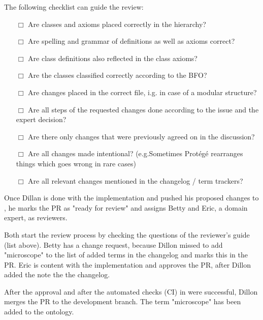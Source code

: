 The following checklist can guide the review:
\begin{itemize}
    \item[$\Box$] Are classes and axioms placed correctly in the hierarchy?
    \item[$\Box$] Are spelling and grammar of definitions as well as axioms correct?
    \item[$\Box$] Are class definitions also reflected in the class axioms?
    \item[$\Box$] Are the classes classified correctly according to the BFO?
    \item[$\Box$] Are changes placed in the correct file, i.g. in case of a modular structure?
    \item[$\Box$] Are all steps of the requested changes done according to the issue and the expert decision?
    \item[$\Box$] Are there only changes that were previously agreed on in the discussion?
    \item[$\Box$] Are all changes made intentional? (e.g.Sometimes Protégé rearranges things which goes wrong in rare cases)
    \item[$\Box$] Are all relevant changes mentioned in the changelog / term trackers?
\end{itemize}
    
\begin{example}
Once Dillan is done with the implementation and pushed his proposed changes to {\github}, he marks the PR as "ready for review" and assigns Betty and Eric, a domain expert, as reviewers. 

Both start the review process by checking the questions of the reviewer's guide (list above). 
Betty has a change request, because Dillon missed to add "microscope" to the list of added terms in the changelog and marks this in the PR. Eric is content with the implementation and approves the PR, after Dillon added the note the the changelog.

After the approval and after the automated checks (CI) in {\github} were successful, Dillon merges the PR to the development branch. The term "microscope" has been added to the ontology.
\end{example}

